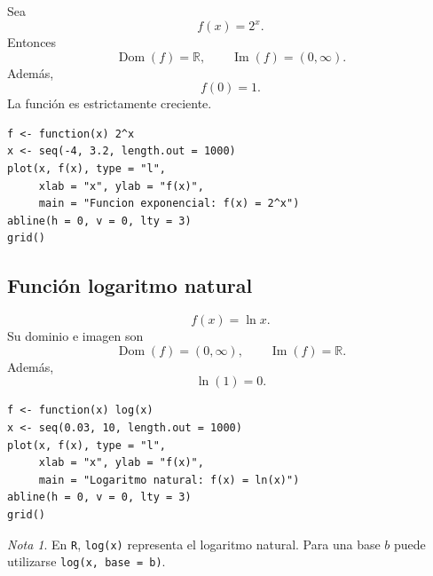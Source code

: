\documentclass[12pt]{article}
\theoremstyle{remark}
\newtheorem{nota}{Nota}[section]
\newcommand{\R}{\mathbb{R}}
\newcommand{\Dom}{\operatorname{Dom}}
\newcommand{\Ima}{\operatorname{Im}}
\begin{document}
Sea
\[
f(x)=2^x.
\]
Entonces
\[
\Dom(f)=\R,\qquad \Ima(f)=(0,\infty).
\]
Además,
\[
f(0)=1.
\]
La función es estrictamente creciente.

\begin{center}
\end{center}

\begin{verbatim}
f <- function(x) 2^x
x <- seq(-4, 3.2, length.out = 1000)
plot(x, f(x), type = "l",
     xlab = "x", ylab = "f(x)",
     main = "Funcion exponencial: f(x) = 2^x")
abline(h = 0, v = 0, lty = 3)
grid()
\end{verbatim}

\subsection{Función logaritmo natural}

\[
f(x)=\ln x.
\]
Su dominio e imagen son
\[
\Dom(f)=(0,\infty),
\qquad
\Ima(f)=\R.
\]
Además,
\[
\ln(1)=0.
\]

\begin{center}
\end{center}

\begin{verbatim}
f <- function(x) log(x)
x <- seq(0.03, 10, length.out = 1000)
plot(x, f(x), type = "l",
     xlab = "x", ylab = "f(x)",
     main = "Logaritmo natural: f(x) = ln(x)")
abline(h = 0, v = 0, lty = 3)
grid()
\end{verbatim}

\begin{nota}
En \texttt{R}, \texttt{log(x)} representa el logaritmo natural. Para una base
$b$ puede utilizarse \texttt{log(x, base = b)}.
\end{nota}
\end{document}
